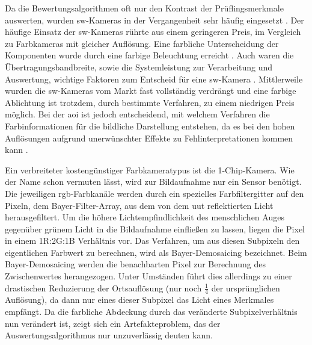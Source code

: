         Da die Bewertungsalgorithmen oft nur den Kontrast der Prüflingsmerkmale auswerten, wurden \acl{sw}-Kameras in der Vergangenheit sehr häufig eingesetzt \cite{berger_test-_2012}.
        Der häufige Einsatz der \ac{sw}-Kameras rührte aus einem geringeren Preis, im Vergleich zu Farbkameras mit gleicher Auflösung.
        Eine farbliche Unterscheidung der Komponenten wurde durch eine farbige Beleuchtung erreicht \cite{berger_test-_2012}.
        Auch waren die Übertragungsbandbreite, sowie die Systemleistung zur Verarbeitung und Auswertung, wichtige Faktoren zum Entscheid für eine \ac{sw}-Kamera \cite{berger_test-_2012}.
        Mittlerweile wurden die \ac{sw}-Kameras vom Markt fast vollständig verdrängt \cite{berger_test-_2012} und eine farbige Ablichtung ist trotzdem, durch bestimmte Verfahren, zu einem niedrigen Preis möglich.
        Bei der \ac{aoi} ist jedoch entscheidend, mit welchem Verfahren die Farbinformationen für die bildliche Darstellung entstehen, da es bei den hohen Auflösungen aufgrund unerwünschter Effekte zu Fehlinterpretationen kommen kann \cite{berger_test-_2012}.

        Ein verbreiteter kostengünstiger Farbkameratypus ist die 1-Chip-Kamera.
        Wie der Name schon vermuten lässt, wird zur Bildaufnahme nur ein Sensor benötigt.
        Die jeweiligen \ac{rgb}-Farbkanäle werden durch ein spezielles Farbfiltergitter auf den Pixeln, dem Bayer-Filter-Array, aus dem von dem \ac{uut} reflektierten Licht herausgefiltert.
        Um die höhere Lichtempfindlichkeit des menschlichen Auges gegenüber grünem Licht in die Bildaufnahme einfließen zu lassen, liegen die Pixel in einem 1R:2G:1B Verhältnis vor.
        Das Verfahren, um aus diesen Subpixeln den eigentlichen Farbwert zu berechnen, wird als Bayer-Demosaicing bezeichnet.
        Beim Bayer-Demosaicing werden die benachbarten Pixel zur Berechnung des Zwischenwertes herangezogen.
        Unter Umständen führt dies allerdings zu einer drastischen Reduzierung der Ortsauflösung (nur noch $\frac{1}{4}$ der ursprünglichen Auflösung), da dann nur eines dieser Subpixel das Licht eines Merkmales empfängt.
        Da die farbliche Abdeckung durch das veränderte Subpixelverhältnis nun verändert ist, zeigt sich ein Artefakteproblem, das der Auswertungsalgorithmus nur unzuverlässig deuten kann. \cite{berger_test-_2012}

